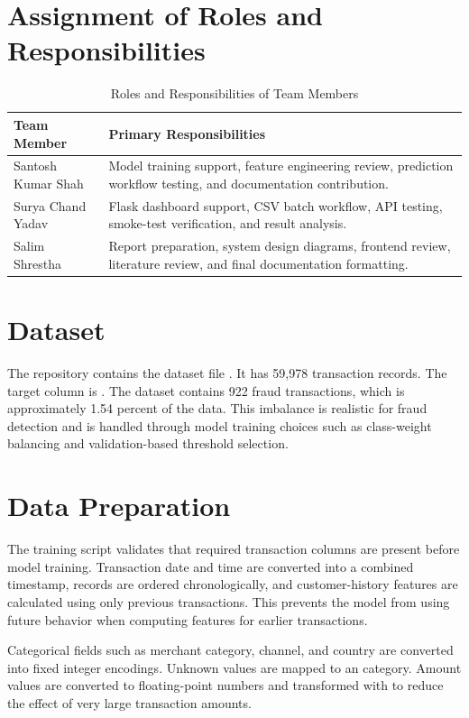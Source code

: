 \documentclass[12pt,a4paper]{report}
\begin{document}
\section{Assignment of Roles and Responsibilities}
\begin{table}[H]
\centering
\caption{Roles and Responsibilities of Team Members}
\begin{tabular}{p{} p{}}
\toprule
\textbf{Team Member} & \textbf{Primary Responsibilities} \\
\midrule
Santosh Kumar Shah & Model training support, feature engineering review, prediction workflow testing, and documentation contribution. \\
Surya Chand Yadav & Flask dashboard support, CSV batch workflow, API testing, smoke-test verification, and result analysis. \\
Salim Shrestha & Report preparation, system design diagrams, frontend review, literature review, and final documentation formatting. \\
\bottomrule
\end{tabular}
\end{table}

\section{Dataset}
The repository contains the dataset file . It has 59,978 transaction records. The target column is . The dataset contains 922 fraud transactions, which is approximately 1.54 percent of the data. This imbalance is realistic for fraud detection and is handled through model training choices such as class-weight balancing and validation-based threshold selection.

\section{Data Preparation}
The training script validates that required transaction columns are present before model training. Transaction date and time are converted into a combined timestamp, records are ordered chronologically, and customer-history features are calculated using only previous transactions. This prevents the model from using future behavior when computing features for earlier transactions.

Categorical fields such as merchant category, channel, and country are converted into fixed integer encodings. Unknown values are mapped to an  category. Amount values are converted to floating-point numbers and transformed with  to reduce the effect of very large transaction amounts.
\end{document}
